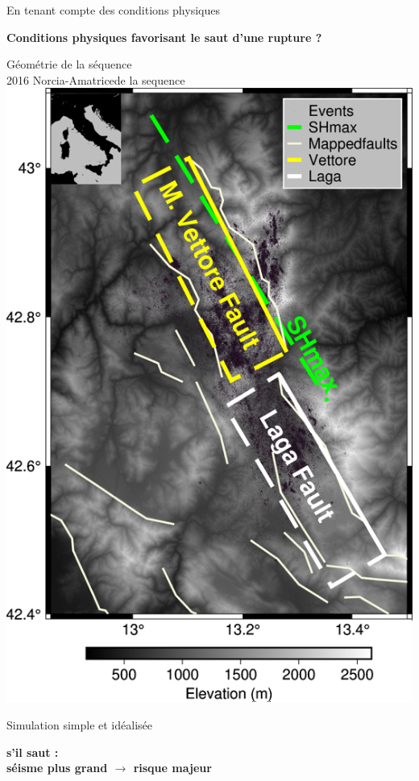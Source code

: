 \documentclass{beamer}
\begin{document}
\begin{frame}
 {En tenant compte des conditions physiques}

{\bf Conditions physiques favorisant le saut d'une rupture ?}

\begin{minipage}{0.46\linewidth}
\vskip 0.2cm
\centering Géométrie de la séquence \\
2016 Norcia-Amatricede la sequence \\
\vskip 0.1cm
\includegraphics[width=0.7\linewidth]{images/Map_Italy.png}
\end{minipage}
\begin{minipage}{0.52\linewidth}
\vskip 0.3cm
\begin{center}
Simulation simple et idéalisée \\
\end{center}
\vskip -1cm  \hskip -3cm	
\begin{center}
\vskip -0.7cm {\small \bf s'il saut : \\ séisme plus grand $\rightarrow$ risque majeur }
\end{center}

\end{minipage}

\end{frame}
\end{document}
